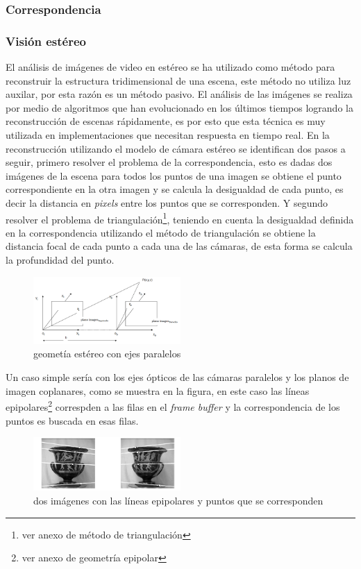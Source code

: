 \subsubsection{Correspondencia}

\subsubsection{Visión estéreo}

\cite {StereoReview} El análisis de imágenes de video en estéreo se ha utilizado como método para reconstruir la estructura tridimensional de una escena, este método no utiliza luz auxilar, por esta razón es un método pasivo. El análisis de las imágenes se realiza por medio de algoritmos que han evolucionado en los últimos tiempos logrando la reconstrucción de escenas rápidamente, es por esto que esta técnica es muy utilizada en implementaciones que necesitan respuesta en tiempo real.
En la reconstrucción utilizando el modelo de cámara estéreo se identifican dos pasos a seguir, primero resolver el problema de la correspondencia, esto es dadas dos imágenes de la escena para todos los puntos de una imagen se obtiene el punto correspondiente en la otra imagen y se calcula la desigualdad de cada punto, es decir la distancia en \emph{pixels} entre los puntos que se corresponden.
Y segundo resolver el problema de triangulación\footnote{ver anexo de método de triangulación}, teniendo en cuenta la desigualdad definida en la correspondencia utilizando el método de triangulación se obtiene la distancia focal de cada punto a cada una de las cámaras, de esta forma se calcula la profundidad del punto.
\begin{figure}[H]
  \centering
    \includegraphics[width=0.5\textwidth]{./Cap2_videomapping/stereo.PNG}
  \caption{geometía estéreo con ejes paralelos}%
  \label{fig:Stereo}
\end{figure}
Un caso simple sería con los ejes ópticos de las cámaras paralelos y los planos de imagen coplanares, como se muestra en la figura, en este caso las líneas epipolares\footnote{ver anexo de geometría epipolar} correspden a las filas en el \emph{frame buffer} y la correspondencia de los puntos es buscada en esas filas.
\begin{figure}[H]
  \centering
    \includegraphics[width=0.5\textwidth]{./Cap2_videomapping/epipolar3.PNG}
  \caption{dos imágenes con las líneas epipolares y puntos que se corresponden}%
  \label{fig:Stereo2}
\end{figure}

